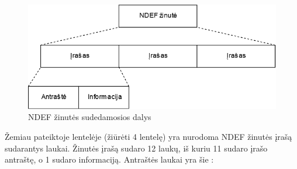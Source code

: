 \begin{figure}[H]
    \centering
    \includegraphics[scale=0.5]{images/NDEF}
    \caption{NDEF žinutės sudedamosios dalys} 
\end{figure}


Žemiau pateiktoje lentelėje (žiūrėti 4 lentelę) yra nurodoma NDEF žinutės įrašą sudarantys laukai. Žinutės įrašą sudaro 12 laukų, iš kuriu 11 sudaro įrašo antraštę, o 1 sudaro informaciją.
Antraštės laukai yra šie \cite{NFCForum2006}: 
